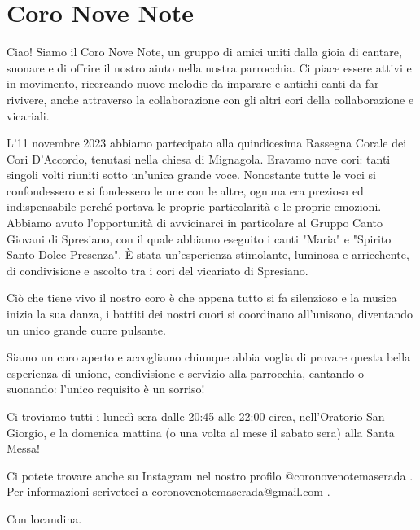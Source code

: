 \section{Coro Nove Note}
Ciao! Siamo il Coro Nove Note, un gruppo di amici uniti dalla gioia di cantare, suonare e di offrire il nostro aiuto nella nostra parrocchia.
Ci piace essere attivi e in movimento, ricercando nuove melodie da imparare e antichi canti da far rivivere, anche attraverso la collaborazione con gli altri cori della collaborazione e vicariali.


L'11 novembre 2023 abbiamo partecipato alla quindicesima Rassegna Corale dei Cori D'Accordo, tenutasi nella chiesa di Mignagola. 
Eravamo nove cori: tanti singoli volti riuniti sotto un'unica grande voce. Nonostante tutte le voci si confondessero e si fondessero le une con le altre, ognuna era preziosa ed indispensabile perché portava le proprie particolarità e le proprie emozioni.
Abbiamo avuto l'opportunità di avvicinarci in particolare al Gruppo Canto Giovani di Spresiano, con il quale abbiamo eseguito i canti "Maria" e "Spirito Santo Dolce Presenza".
È stata un'esperienza stimolante, luminosa e arricchente, di condivisione e ascolto tra i cori del vicariato di Spresiano. 


Ciò che tiene vivo il nostro coro è che appena tutto si fa silenzioso e la musica inizia la sua danza, i battiti dei nostri cuori si coordinano all'unisono, diventando un unico grande cuore pulsante.


Siamo un coro aperto e accogliamo chiunque abbia voglia di provare questa bella esperienza di unione, condivisione e servizio alla parrocchia, cantando o suonando: l'unico requisito è un sorriso!


Ci troviamo tutti i lunedì sera dalle 20:45 alle 22:00 circa, nell'Oratorio San Giorgio, e la domenica mattina (o una volta al mese il sabato sera) alla Santa Messa!


Ci potete trovare anche su Instagram nel nostro profilo @coronovenotemaserada .
Per informazioni scriveteci a coronovenotemaserada@gmail.com .


Con locandina.


